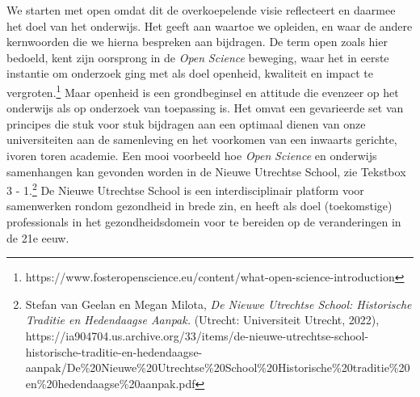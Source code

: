 \documentclass[smallauthor, chapterhaspagenum, nochapterinheader, pagenuminheader,  bigchapnum,medium2, tocpages,  garamond, titleinheader]{jote-book}
\begin{document}
	We starten met open omdat dit de overkoepelende visie reflecteert en daarmee het doel van het onderwijs. Het geeft aan waartoe we opleiden, en waar de andere kernwoorden die we hierna bespreken aan bijdragen. De term open zoals hier bedoeld, kent zijn oorsprong in de \emph{Open }\emph{Science} beweging, waar het in eerste instantie om onderzoek ging met als doel openheid, kwaliteit en impact te vergroten.\footnote{https://www.fosteropenscience.eu/content/what-open-science-introduction} Maar openheid is een grondbeginsel en attitude die evenzeer op het onderwijs als op onderzoek van toepassing is. Het omvat een gevarieerde set van principes die stuk voor stuk bijdragen aan een optimaal dienen van onze universiteiten aan de samenleving en het voorkomen van een inwaarts gerichte, ivoren toren academie. Een mooi voorbeeld hoe \emph{Open }\emph{Science} en onderwijs samenhangen kan gevonden worden in de Nieuwe Utrechtse School, zie Tekstbox 3 - 1.\footnote{Stefan van Geelan en Megan Milota, \emph{De Nieuwe Utrechtse School: Historische Traditie en Hedendaagse Aanpak.}\emph{ }(Utrecht: Universiteit Utrecht, 2022), https://ia904704.us.archive.org/33/items/de-nieuwe-utrechtse-school-historische-traditie-en-hedendaagse-aanpak/De\%20Nieuwe\%20Utrechtse\%20School\%20Historische\%20traditie\%20en\%20hedendaagse\%20aanpak.pdf} De Nieuwe Utrechtse School is een interdisciplinair platform voor samenwerken rondom gezondheid in brede zin, en heeft als doel (toekomstige) professionals in het gezondheidsdomein voor te bereiden op de veranderingen in de 21e eeuw.
\end{document}
